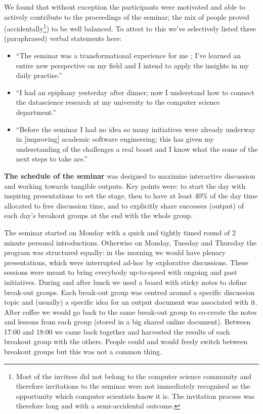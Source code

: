 \documentclass[a4paper,UKenglish]{dagrep}
\begin{document}
We found that without exception the participants were motivated and able to actively contribute to the proceedings of the seminar; the mix of people proved (accidentally\footnote{Most of the invitees did not belong to the computer science community and therefore invitations to the seminar were not immediately recognised as the opportunity which computer scientists know it is. The invitation process was therefore long and with a semi-accidental outcome.}) to be well balanced. To attest to this we've selectively listed three (paraphrased) verbal statements here:
\begin{itemize}
\item ``The seminar was a transformational experience for me	; I've learned an entire new perspective on my field and I intend to apply the insights in my daily practise.''
\item ``I had an epiphany yesterday after dinner; now I understand how to connect the datascience research at my university to the computer science department.''
\item ``Before the seminar I had no idea so many initiatives were already underway in [improving] academic software engineering; this has given my understanding of the challenges a real boost and I know what the some of the next steps to take are.''
\end{itemize}

\textbf{The schedule of the seminar} was designed to maximize interactive discussion and working towards tangible outputs. Key points were: to start the day with inspiring presentations to set the stage, then to have at least 40\% of the day time allocated to free discussion time, and to explicitly share successes (output) of each day's breakout groups at the end with the whole group. 

The seminar started on Monday with a quick and tightly timed round of 2 minute personal introductions. Otherwise on Monday, Tuesday and Thursday the program was structured equally: in the morning we would have plenary presentations, which were interrupted ad-hoc by explorative discussions. These sessions were meant to bring everybody up-to-speed with ongoing and past initiatives. During and after lunch we used a board with sticky notes to define break-out groups. Each break-out group was centred around a specific discussion topic and (usually) a specific idea for an output document was associated with it. After coffee we would go back to the same break-out group to co-create the notes and lessons from each group (stored in a big shared online document). Between 17:00 and 18:00 we came back together and harvested the results of each breakout group with the others. People could and would freely switch between breakout groups but this was not a common thing.
\end{document}
